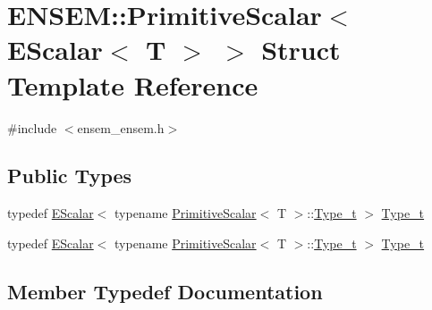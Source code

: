 \hypertarget{structENSEM_1_1PrimitiveScalar_3_01EScalar_3_01T_01_4_01_4}{}\section{E\+N\+S\+EM\+:\+:Primitive\+Scalar$<$ E\+Scalar$<$ T $>$ $>$ Struct Template Reference}
\label{structENSEM_1_1PrimitiveScalar_3_01EScalar_3_01T_01_4_01_4}


{\ttfamily \#include $<$ensem\+\_\+ensem.\+h$>$}

\subsection*{Public Types}
\begin{DoxyCompactItemize}
\item 
typedef \mbox{\hyperlink{classENSEM_1_1EScalar}{E\+Scalar}}$<$ typename \mbox{\hyperlink{structENSEM_1_1PrimitiveScalar}{Primitive\+Scalar}}$<$ T $>$\+::\mbox{\hyperlink{structENSEM_1_1PrimitiveScalar_3_01EScalar_3_01T_01_4_01_4_ae8493f2baf01f4ada1e2aec48076b72d}{Type\+\_\+t}} $>$ \mbox{\hyperlink{structENSEM_1_1PrimitiveScalar_3_01EScalar_3_01T_01_4_01_4_ae8493f2baf01f4ada1e2aec48076b72d}{Type\+\_\+t}}
\item 
typedef \mbox{\hyperlink{classENSEM_1_1EScalar}{E\+Scalar}}$<$ typename \mbox{\hyperlink{structENSEM_1_1PrimitiveScalar}{Primitive\+Scalar}}$<$ T $>$\+::\mbox{\hyperlink{structENSEM_1_1PrimitiveScalar_3_01EScalar_3_01T_01_4_01_4_ae8493f2baf01f4ada1e2aec48076b72d}{Type\+\_\+t}} $>$ \mbox{\hyperlink{structENSEM_1_1PrimitiveScalar_3_01EScalar_3_01T_01_4_01_4_ae8493f2baf01f4ada1e2aec48076b72d}{Type\+\_\+t}}
\end{DoxyCompactItemize}


\subsection{Member Typedef Documentation}
\mbox{\label{structENSEM_1_1PrimitiveScalar_3_01EScalar_3_01T_01_4_01_4_ae8493f2baf01f4ada1e2aec48076b72d}} 
